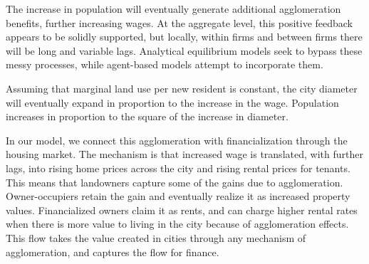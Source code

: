 The increase in population will eventually generate additional agglomeration benefits, further increasing wages. At the aggregate level, this positive feedback appears to be solidly supported, but locally, within firms and between firms there will be long and variable lags. Analytical equilibrium models seek to bypass these messy processes, while agent-based models attempt to incorporate them.



Assuming that marginal land use per new resident is constant, the city diameter will eventually expand in proportion to the increase in the wage. %
Population increases in proportion to the square of the increase in diameter. %

In our model, we connect this agglomeration with financialization through the housing market. The mechanism is that increased wage is translated, with further lags, into rising home prices across the city and rising rental prices for tenants. This means that landowners capture some of the gains due to agglomeration. Owner-occupiers retain the gain and eventually realize it as increased  property values. Financialized owners claim it as rents, and can charge higher rental rates when there is more value to living in the city because of agglomeration effects. %
This flow takes the value created in cities through any mechanism of agglomeration, and captures the flow for finance. 



